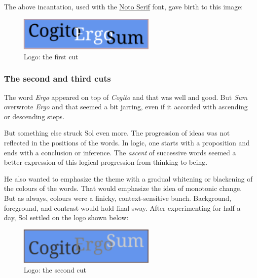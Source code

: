 \documentclass[
  11pt,
  british,
  a4paper,
]{article}
\makeatletter
\newcounter{figno}
\newenvironment{fignos:no-prefix-figure-caption}{
      \caption@ifcompatibility{}{
        \let\oldthefigure\thefigure
        \let\oldtheHfigure\theHfigure
        \renewcommand{\thefigure}{figno:\thefigno}
        \renewcommand{\theHfigure}{figno:\thefigno}
        \stepcounter{figno}
        \captionsetup{labelformat=empty}
      }
    }{
      \caption@ifcompatibility{}{
        \captionsetup{labelformat=default}
        \let\thefigure\oldthefigure
        \let\theHfigure\oldtheHfigure
        \addtocounter{figure}{-1}
      }
    }
\makeatother
\begin{document}
The above incantation, used with the
\href{https://fonts.google.com/specimen/Noto+Serif}{Noto Serif} font,
gave birth to this image:

\begin{fignos:no-prefix-figure-caption}

\begin{figure}
\centering
\includegraphics[width=0.6\textwidth,height=\textheight]{images/firstcut.svg}
\caption{Logo: the first cut}
\end{figure}

\end{fignos:no-prefix-figure-caption}

\hypertarget{the-second-and-third-cuts}{%
\subsubsection{The second and third
cuts}\label{the-second-and-third-cuts}}

The word \emph{Ergo} appeared on top of \emph{Cogito} and that was well
and good. But \emph{Sum} overwrote \emph{Ergo} and that seemed a bit
jarring, even if it accorded with ascending or descending steps.

But something else struck Sol even more. The progression of ideas was
not reflected in the positions of the words. In logic, one starts with a
proposition and ends with a conclusion or inference. The \emph{ascent}
of successive words seemed a better expression of this logical
progression from thinking to being.

He also wanted to emphasize the theme with a gradual whitening or
blackening of the colours of the words. That would emphasize the idea of
monotonic change. But as always, colours were a finicky,
context-sensitive bunch. Background, foreground, and contrast would hold
final sway. After experimenting for half a day, Sol settled on the logo
shown below:

\begin{fignos:no-prefix-figure-caption}

\begin{figure}
\centering
\includegraphics[width=0.6\textwidth,height=\textheight]{images/secondcut.svg}
\caption{Logo: the second cut}
\end{figure}

\end{fignos:no-prefix-figure-caption}
\end{document}
